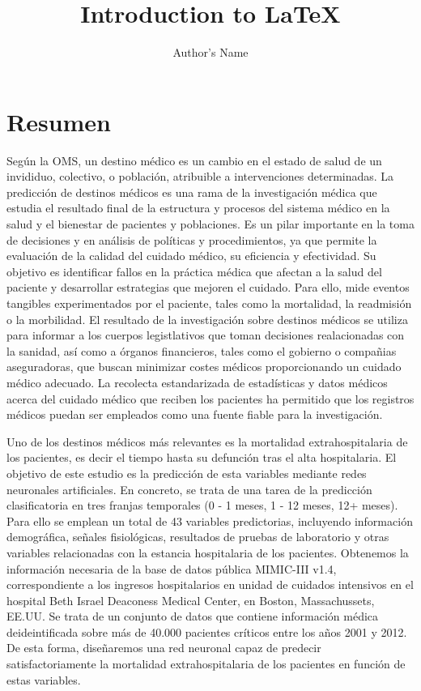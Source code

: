 \documentclass{report}
\begin{document}
\title{Introduction to \LaTeX{}}
\author{Author's Name}

\maketitle
\tableofcontents


\chapter*{Resumen}


\vspace{-5mm}
Según la OMS, un destino médico es un cambio en el estado de salud de un invididuo, colectivo, o población, atribuible a intervenciones determinadas. La predicción de destinos médicos es una rama de la investigación médica que estudia el resultado final de la estructura y procesos del sistema médico en la salud y el bienestar de pacientes y poblaciones. Es un pilar importante en la toma de decisiones y en análisis de políticas y procedimientos, ya que permite la evaluación de la calidad del cuidado médico, su eficiencia y efectividad. Su objetivo es identificar fallos en la práctica médica que afectan a la salud del paciente y desarrollar estrategias que mejoren el cuidado. Para ello, mide eventos tangibles experimentados por el paciente, tales como la mortalidad, la readmisión o la morbilidad. El resultado de la investigación sobre destinos médicos se utiliza para informar a los cuerpos legistlativos que toman decisiones realacionadas con la sanidad, así como a órganos financieros, tales como el gobierno o compañias aseguradoras, que buscan minimizar costes médicos proporcionando un cuidado médico adecuado. La recolecta estandarizada de estadísticas y datos médicos acerca del cuidado médico que reciben los pacientes ha permitido que los registros médicos puedan ser empleados como una fuente fiable para la investigación.


Uno de los destinos médicos más relevantes es la mortalidad extrahospitalaria de los pacientes, es decir el tiempo hasta su defunción tras el alta hospitalaria. El objetivo de este estudio es la predicción de esta variables mediante redes neuronales artificiales. En concreto, se trata de una tarea de la predicción clasificatoria en tres franjas temporales (0 - 1 meses, 1 - 12 meses, 12+ meses). Para ello se emplean un total de 43 variables predictorias, incluyendo información demográfica, señales fisiológicas, resultados de pruebas de laboratorio y otras variables relacionadas con la estancia hospitalaria de los pacientes. Obtenemos la información necesaria de la base de datos pública MIMIC-III v1.4, correspondiente a los ingresos hospitalarios en unidad de cuidados intensivos en el hospital Beth Israel Deaconess Medical Center, en Boston, Massachussets, EE.UU. Se trata de un conjunto de datos que contiene información médica deideintificada sobre más de 40.000 pacientes críticos entre los años 2001 y 2012. De esta forma, diseñaremos una red neuronal capaz de predecir satisfactoriamente la mortalidad extrahospitalaria de los pacientes en función de estas variables.
\vspace{5mm} 
\end{document}
